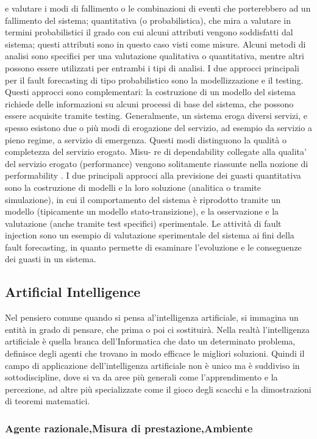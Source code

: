 \documentclass[14pt]{extarticle}
\begin{document}
e valutare i modi di fallimento o le combinazioni di eventi che porterebbero ad
un fallimento del sistema; quantitativa (o probabilistica), che mira a valutare
in termini probabilistici il grado con cui alcuni attributi vengono soddisfatti
dal sistema; questi attributi sono in questo caso visti come misure. Alcuni
metodi di analisi sono specifici per una valutazione qualitativa o quantitativa, mentre altri possono essere utilizzati per entrambi i tipi di analisi. I due approcci principali per il fault forecasting di tipo probabilistico sono la modellizzazione e il testing. Questi approcci sono complementari: la costruzione di
un modello del sistema richiede delle informazioni su alcuni processi di base
del sistema, che possono essere acquisite tramite testing. Generalmente, un
sistema eroga diversi servizi, e spesso esistono due o più modi di erogazione
del servizio, ad esempio da servizio a pieno regime, a servizio di emergenza.
Questi modi distinguono la qualità o completezza del servizio erogato. Misu-
re di dependability collegate alla qualita’ del servizio erogato (performance)
vengono solitamente riassunte nella nozione di performability \cite{smith1988performability}.
I due principali approcci alla previsione dei guasti quantitativa sono la
costruzione di modelli e la loro soluzione (analitica o tramite simulazione), in
cui il comportamento del sistema è riprodotto tramite un modello (tipicamente
un modello stato-transizione), e la osservazione e la valutazione (anche tramite
test specifici) sperimentale. Le attività di fault injection sono un esempio di
valutazione sperimentale del sistema ai fini della fault forecasting, in quanto
permette di esaminare l’evoluzione e le conseguenze dei guasti in un sistema.


\subsection{Artificial Intelligence}
Nel pensiero comune quando si pensa al'intelligenza artificiale, si immagina un entità in grado di pensare, che prima o poi ci sostituirà. Nella realtà l'intelligenza artificiale è quella branca dell'Informatica che dato un determinato problema, definisce degli agenti che trovano in modo efficace le migliori soluzioni. Quindi il campo di  applicazione dell'intelligenza artificiale non è unico ma è suddiviso in sottodiscipline, dove si va da aree più generali come l'apprendimento e la percezione, ad altre più specializzate come il gioco degli scacchi e la dimostrazioni di teoremi matematici.
\subsubsection{Agente razionale,Misura di prestazione,Ambiente}
\end{document}
